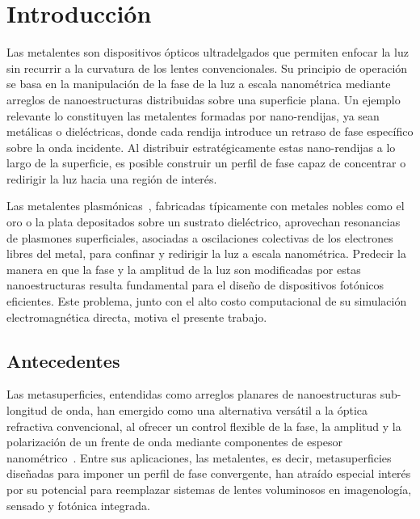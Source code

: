 \section{Introducción}\label{sec:introduccion}

Las metalentes son dispositivos ópticos ultradelgados que permiten enfocar la luz sin recurrir a la curvatura de los lentes convencionales. Su principio de operación se basa en la manipulación de la fase de la luz a escala nanométrica mediante arreglos de nanoestructuras distribuidas sobre una superficie plana. Un ejemplo relevante lo constituyen las metalentes formadas por nano-rendijas, ya sean metálicas o dieléctricas, donde cada rendija introduce un retraso de fase específico sobre la onda incidente. Al distribuir estratégicamente estas nano-rendijas a lo largo de la superficie, es posible construir un perfil de fase capaz de concentrar o redirigir la luz hacia una región de interés.

Las metalentes plasmónicas~\cite{khorasaninejad2017metalenses}, fabricadas típicamente con metales nobles como el oro o la plata depositados sobre un sustrato dieléctrico, aprovechan resonancias de plasmones superficiales, asociadas a oscilaciones colectivas de los electrones libres del metal, para confinar y redirigir la luz a escala nanométrica. Predecir la manera en que la fase y la amplitud de la luz son modificadas por estas nanoestructuras resulta fundamental para el diseño de dispositivos fotónicos eficientes. Este problema, junto con el alto costo computacional de su simulación electromagnética directa, motiva el presente trabajo.

\subsection{Antecedentes}\label{subsec:antecedentes}

Las metasuperficies, entendidas como arreglos planares de nanoestructuras sub-longitud de onda, han emergido como una alternativa versátil a la óptica refractiva convencional, al ofrecer un control flexible de la fase, la amplitud y la polarización de un frente de onda mediante componentes de espesor nanométrico~\cite{khorasaninejad2017metalenses}. Entre sus aplicaciones, las metalentes, es decir, metasuperficies diseñadas para imponer un perfil de fase convergente, han atraído especial interés por su potencial para reemplazar sistemas de lentes voluminosos en imagenología, sensado y fotónica integrada.

